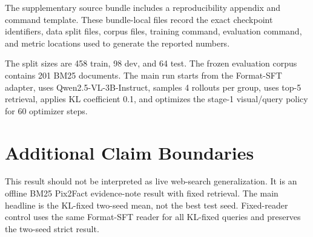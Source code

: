 The supplementary source bundle includes a reproducibility appendix and command template. These bundle-local files record the exact checkpoint identifiers, data split files, corpus files, training command, evaluation command, and metric locations used to generate the reported numbers.

The split sizes are 458 train, 98 dev, and 64 test. The frozen evaluation corpus contains 201 BM25 documents. The main run starts from the Format-SFT adapter, uses Qwen2.5-VL-3B-Instruct, samples 4 rollouts per group, uses top-5 retrieval, applies KL coefficient 0.1, and optimizes the stage-1 visual/query policy for 60 optimizer steps.

\section{Additional Claim Boundaries}

This result should not be interpreted as live web-search generalization. It is an offline BM25 Pix2Fact evidence-note result with fixed retrieval. The main headline is the KL-fixed two-seed mean, not the best test seed. Fixed-reader control uses the same Format-SFT reader for all KL-fixed queries and preserves the two-seed strict result.
